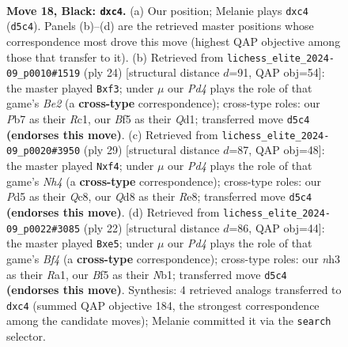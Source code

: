 \documentclass[11pt]{article}
\begin{document}
\clearpage

\begin{figure}[p]\centering
\begin{subfigure}{0.46\textwidth}\centering
\resizebox{\linewidth}{!}{%
\newchessgame
\chessboard[
  setfen={r2qk2r/ppp1b3/n4pp1/3p1b1p/P1BP4/2N1R2N/RPP2PPP/2BQ2K1 b kq - 0 18},
  showmover=false,
  pgfstyle=straightmove, color=movearrow, markmove={d5-c4}
]}
\caption{}
\end{subfigure}\hfill
\begin{subfigure}{0.46\textwidth}\centering
\resizebox{\linewidth}{!}{%
\newchessgame
\chessboard[
  setfen={2rq1rk1/pp2ppbp/5np1/n2p4/3P1B2/P1N1Pb1P/1P2BPP1/2RQ1RK1 w - - 0 13},
  showmover=false,
  pgfstyle=straightmove, color=movearrow, markmove={e2-f3}
]}
\caption{}
\end{subfigure}
\\[4pt]
\begin{subfigure}{0.46\textwidth}\centering
\resizebox{\linewidth}{!}{%
\newchessgame
\chessboard[
  setfen={r1q1r1k1/p1pN1pp1/bp1b3p/3p3n/3P1B2/5NP1/PP2PPBP/2RQR1K1 b - - 0 15},
  showmover=false,
  pgfstyle=straightmove, color=movearrow, markmove={h5-f4}
]}
\caption{}
\end{subfigure}\hfill
\begin{subfigure}{0.46\textwidth}\centering
\resizebox{\linewidth}{!}{%
\newchessgame
\chessboard[
  setfen={r2q1rk1/pbp2pbp/1p3np1/4n3/4PB2/3B3P/PPP2PP1/RN1QR1K1 w - - 0 12},
  showmover=false,
  pgfstyle=straightmove, color=movearrow, markmove={f4-e5}
]}
\caption{}
\end{subfigure}
\caption{\textbf{Move 18, Black: \texttt{dxc4}.} (a) Our position; Melanie plays \texttt{dxc4} (\texttt{d5c4}). Panels (b)--(d) are the retrieved master positions whose correspondence most drove this move (highest QAP objective among those that transfer to it). (b) Retrieved from \texttt{lichess\_elite\_2024-09\_p0010\#1519} (ply 24) [structural distance $d$=91, QAP obj=54]: the master played \texttt{Bxf3}; under $\mu$ our \emph{Pd4} plays the role of that game's \emph{Be2} (a \textbf{cross-type} correspondence); cross-type roles: our \emph{P}b7 as their \emph{R}c1, our \emph{B}f5 as their \emph{Q}d1; transferred move \texttt{d5c4} \textbf{(endorses this move)}. (c) Retrieved from \texttt{lichess\_elite\_2024-09\_p0020\#3950} (ply 29) [structural distance $d$=87, QAP obj=48]: the master played \texttt{Nxf4}; under $\mu$ our \emph{Pd4} plays the role of that game's \emph{Nh4} (a \textbf{cross-type} correspondence); cross-type roles: our \emph{P}d5 as their \emph{Q}c8, our \emph{Q}d8 as their \emph{R}e8; transferred move \texttt{d5c4} \textbf{(endorses this move)}. (d) Retrieved from \texttt{lichess\_elite\_2024-09\_p0022\#3085} (ply 22) [structural distance $d$=86, QAP obj=44]: the master played \texttt{Bxe5}; under $\mu$ our \emph{Pd4} plays the role of that game's \emph{Bf4} (a \textbf{cross-type} correspondence); cross-type roles: our \emph{n}h3 as their \emph{R}a1, our \emph{B}f5 as their \emph{N}b1; transferred move \texttt{d5c4} \textbf{(endorses this move)}. Synthesis: 4 retrieved analogs transferred to \texttt{dxc4} (summed QAP objective 184, the strongest correspondence among the candidate moves); Melanie committed it via the \texttt{search} selector.}

\end{figure}
\end{document}
